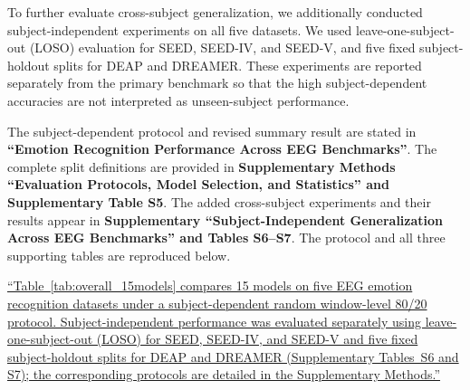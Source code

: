 \documentclass[12pt,technote,onecolumn]{IEEEtran}
\begin{document}
To further evaluate cross-subject generalization, we additionally conducted
subject-independent experiments on all five datasets. We used
leave-one-subject-out (LOSO) evaluation for SEED, SEED-IV, and SEED-V, and
five fixed subject-holdout splits for DEAP and DREAMER. These experiments are
reported separately from the primary benchmark so that the high
subject-dependent accuracies are not interpreted as unseen-subject
performance.



The subject-dependent protocol and revised summary result are stated in \textbf{``Emotion Recognition Performance Across EEG Benchmarks''}. The complete split definitions are provided in \textbf{Supplementary Methods ``Evaluation Protocols, Model Selection, and Statistics'' and Supplementary Table S5}. The added cross-subject experiments and their results appear in \textbf{Supplementary ``Subject-Independent Generalization Across EEG Benchmarks'' and Tables S6--S7}. The protocol and all three supporting tables are reproduced below.

\uline{``Table~\ref{tab:overall_15models} compares 15 models on five EEG emotion recognition datasets under a subject-dependent random window-level 80/20 protocol. Subject-independent performance was evaluated separately using leave-one-subject-out (LOSO) for SEED, SEED-IV, and SEED-V and five fixed subject-holdout splits for DEAP and DREAMER (Supplementary Tables~S6 and S7); the corresponding protocols are detailed in the Supplementary Methods.''}
\end{document}
